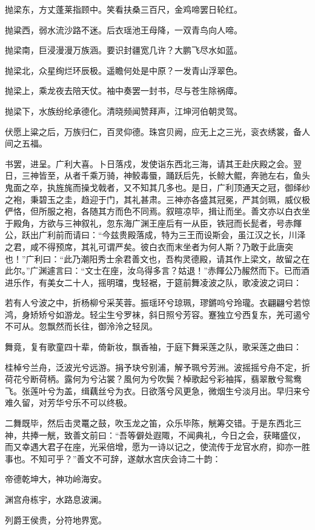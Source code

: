 \documentclass[a4paper,12pt,UTF8,twoside]{ctexbook}
\begin{document}
抛梁东，方丈蓬莱指顾中。笑看扶桑三百尺，金鸡啼罢日轮红。

抛粱西，弱水流沙路不迷。后衣瑶池王母降，一双青鸟向人啼。

抛梁南，巨浸漫漫万族涵。要识封疆宽几许？大鹏飞尽水如蓝。

抛梁北，众星绚烂环辰极。遥瞻何处是中原？一发青山浮翠色。

抛梁上，乘龙夜去陪天仗。袖中奏罢一封书，尽与苍生除祸瘴。

抛梁下，水族纷纶承德化。清晓频闻赞拜声，江坤河伯朝灵驾。

伏愿上粱之后，万族归仁，百灵仰德。珠宫贝阙，应无上之三光，衮衣绣裳，备人间之五福。

书罢，进呈。广利大喜。卜日落戍，发使诣东西北三海，请其王赴庆殿之会。翌日，三神皆至，从者千乘万骑，神鲛毒蜃，踊跃后先，长鲸大鲲，奔驰左右，鱼头鬼面之卒，执旌旄而操戈戟者，又不知其几多也。是日，广利顶通天之冠，御绎纱之袍，秉碧玉之圭，趋迎于门，其礼甚肃。三神亦各盛其冠冕，严其剑珮，威仪极俨恪，但所服之袍，各随其方而色不同焉。叙暄凉毕，揖让而坐。善文亦以白衣坐于殿角，方欲与三神叙礼，忽东海广渊王座后有一从臣，铁冠而长髭者，号赤餫公，跃出广利前而请曰：“今兹贵殿落成，特为三王而设斯会，虽江汉之长，川泽之君，咸不得预席，其礼可谓严矣。彼白衣而末坐者为何人斯？乃敢于此唐突也！”广利曰：“此乃潮阳秀士余君善文也，吾构灵德殿，请其作上梁文，故留之在此尔。”广渊遽言曰：“文士在座，汝乌得多言？姑退！”赤餫公乃赧然而下。已而酒进乐作，有美女二十人，摇明璫，曳轻裾，于筵前舞凌波之队，歌凌波之词曰：

若有人兮波之中，折杨柳兮采芙蓉。振瑶环兮琼珮，璆鏘呜兮玲瓏。衣翩翩兮若惊鸿，身矫矫兮如游龙。轻尘生兮罗袜，斜日照兮芳容。蹇独立兮西复东，羌可遏兮不可从。忽飘然而长往，御泠泠之轻凤。

舞竟，复有歌童四十辈，倚新妆，飘香袖，于庭下舞采莲之队，歌采莲之曲曰：

桂棹兮兰舟，泛波光兮远游。捐予玦兮别浦，解予珮兮芳洲。波摇摇兮舟不定，折荷花兮断荷柄。露何为兮沾裳？風何为兮吹鬓？棹歌起兮彩袖挥，翡翠散兮鸳鸯飞。张莲叶兮为盖，缉藕丝兮为衣。日欲落兮风更急，微烟生兮淡月出。早归来兮难久留，对芳华兮乐不可以终极。

二舞既毕，然后击灵鼍之鼓，吹玉龙之笛，众乐毕陈，觥筹交错。于是东西北三神，共捧一觥，致善文前曰：“吾等僻处遐陬，不闻典礼，今日之会，获睹盛仪，而又幸遇大君子在座，光采倍增，愿为一诗以记之，使流传于龙官水府，抑亦一胜事也。不知可乎？”善文不可辞，遂献水宫庆会诗二十韵：

帝德乾坤大，神功岭海安。

渊宫舟栋宇，水路息波澜。

列爵王侯贵，分符地界宽。
\end{document}
